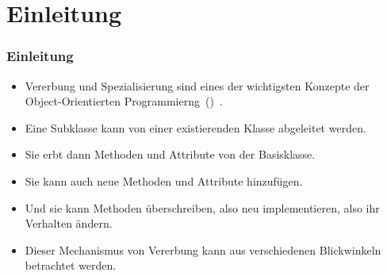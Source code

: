 \documentclass[aspectratio=169,mathserif,notheorems]{beamer}%
\subtitle{43.~Klassen:~Vererbung}%
\begin{document}
%
%
\startPresentation%
%
\section{Einleitung}%
\begin{frame}[t]%
\frametitle{Einleitung}%
\begin{itemize}%
%
\item Vererbung und Spezialisierung sind eines der wichtigsten Konzepte der Object-Orientierten Programmierng~()~.%
%
\item<2-> Eine Subklasse kann von einer existierenden Klasse abgeleitet werden.%
%
\item<3-> Sie erbt dann Methoden und Attribute von der Basisklasse.%
%
\item<4-> Sie kann auch neue Methoden und Attribute hinzufügen.%
%
\item<5-> Und sie kann Methoden überschreiben, also neu implementieren, also ihr Verhalten ändern.%
%
\item<6-> Dieser Mechanismus von Vererbung kann aus verschiedenen Blickwinkeln betrachtet werden.%
\end{itemize}%
\end{frame}%
%
%
\end{document}
